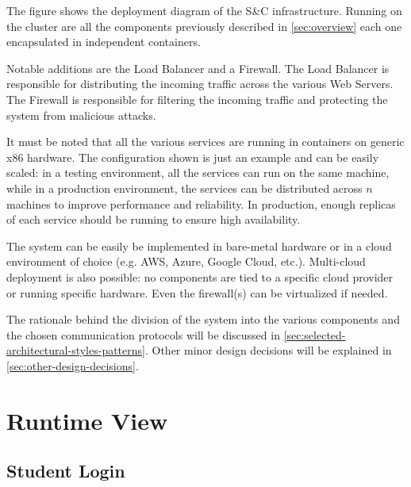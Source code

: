 \par The figure shows the deployment diagram of the S\&C infrastructure. Running on the cluster are all the components
previously described in \ref{sec:overview} each one encapsulated in independent containers.

\par Notable additions are the Load Balancer and a Firewall. The Load Balancer is responsible for distributing the
incoming traffic across the various Web Servers. The Firewall is responsible for filtering the incoming traffic and
protecting the system from malicious attacks.

\par It must be noted that all the various services are running in containers on generic x86 hardware.
The configuration shown is just an example and can be easily scaled: in a testing environment, all the services can run
on the same machine, while in a production environment, the services can be distributed across $n$ machines to improve
performance and reliability. In production, enough replicas of each service should be running to ensure high
availability.

\par The system can be easily be implemented in bare-metal hardware or in a cloud environment of choice (e.g. AWS, Azure,
Google Cloud, etc.). Multi-cloud deployment is also possible: no components are tied to a specific cloud provider or
running specific hardware. Even the firewall(s) can be virtualized if needed.

\par The rationale behind the division of the system into the various components and the chosen communication
protocols will be discussed in \ref{sec:selected-architectural-styles-patterns}. Other minor design decisions will be
explained in \ref{sec:other-design-decisions}.

\section{Runtime View}
\label{sec:runtime-view}%

\subsection{Student Login}
\label{sub:student-login}%

